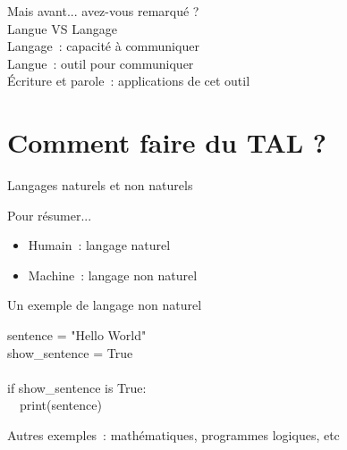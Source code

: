 \documentclass[serif, aspectratio=169]{beamer}
\begin{document}
\begin{exoframe}{}
    \begin{center}
        \Large
        Mais avant... avez-vous remarqué ? \\
        \pause
        Langue VS Langage \\
        \pause
        \vspace{15pt}
        Langage~: capacité à communiquer \\
        Langue~: outil pour communiquer \\
        \pause
        \vspace{15pt}
        Écriture et parole~: applications de cet outil
    \end{center}
\end{exoframe}

\section{Comment faire du TAL ?}

\begin{frame}{Langages naturels et non naturels}
    \begin{block}{Pour résumer...}
        \pause
        \begin{itemize}
            \item Humain~: langage naturel
            \pause
            \item Machine~: langage non naturel
        \end{itemize}
    \end{block}
    \pause
    \begin{block}{Un exemple de langage non naturel}
        \vspace{2pt}
        \begin{CLI}
            sentence = "Hello World" \\
            show\_sentence = True \\
            \\
            if show\_sentence is True: \\
            ~~print(sentence) \\
        \end{CLI}
    \end{block}
    \pause
    \begin{center}
        \Large
        Autres exemples~: mathématiques, programmes logiques, etc
    \end{center}
\end{frame}
\end{document}
